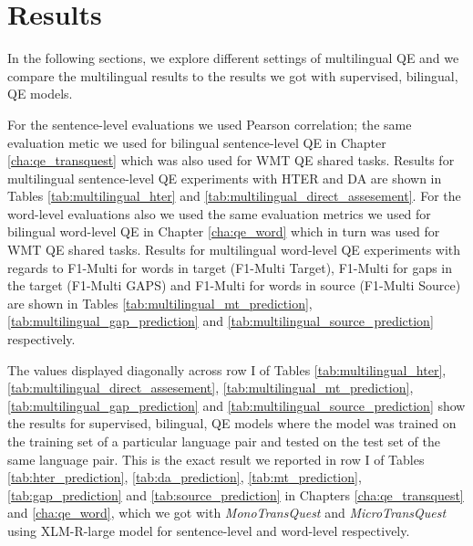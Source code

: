 \section{Results}
\label{sec:multilingual_results}
In the following sections, we explore different settings of multilingual QE and we compare the multilingual results to the results we got with supervised, bilingual, QE models. 

For the sentence-level evaluations we used Pearson correlation; the same evaluation metic we used for bilingual sentence-level QE in Chapter \ref{cha:qe_transquest} which was also used for WMT QE shared tasks. Results for multilingual sentence-level QE experiments with HTER and DA are shown in Tables \ref{tab:multilingual_hter} and \ref{tab:multilingual_direct_assesement}. For the word-level evaluations also we used the same evaluation metrics we used for bilingual word-level QE in Chapter \ref{cha:qe_word} which in turn was used for WMT QE shared tasks. Results for multilingual word-level QE experiments with regards to F1-Multi for words in target (F1-Multi Target), F1-Multi for gaps in the target (F1-Multi GAPS) and F1-Multi for words in source (F1-Multi Source) are shown in Tables \ref{tab:multilingual_mt_prediction}, \ref{tab:multilingual_gap_prediction} and \ref{tab:multilingual_source_prediction} respectively. 

The values displayed diagonally across row I of Tables  \ref{tab:multilingual_hter}, \ref{tab:multilingual_direct_assesement}, \ref{tab:multilingual_mt_prediction}, \ref{tab:multilingual_gap_prediction} and \ref{tab:multilingual_source_prediction} show the results for supervised, bilingual, QE models where the model was trained on the training set of a particular language pair and tested on the test set of the same language pair. This is the exact result we reported in row I of Tables \ref{tab:hter_prediction}, \ref{tab:da_prediction}, \ref{tab:mt_prediction}, \ref{tab:gap_prediction} and \ref{tab:source_prediction} in Chapters \ref{cha:qe_transquest} and \ref{cha:qe_word}, which we got with \textit{MonoTransQuest} and \textit{MicroTransQuest} using  XLM-R-large model \autocite{conneau-etal-2020-unsupervised} for sentence-level and word-level respectively. 

